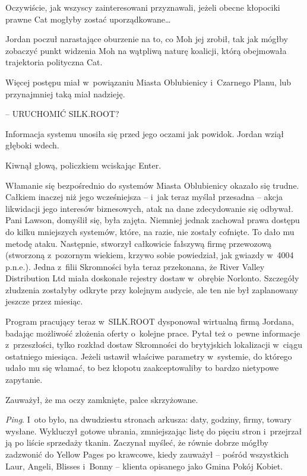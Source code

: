 \documentclass[oneside,polish,11pt,sfheadings]{mwbk}
\begin{document}
Oczywiście, jak wszyscy zainteresowani przyznawali, jeżeli obecne
kłopociki prawne Cat mogłyby zostać uporządkowane\ldots

Jordan poczuł narastające oburzenie na to, co Moh jej zrobił, tak jak
mógłby zobaczyć punkt widzenia Moh na wątpliwą naturę koalicji, którą
obejmowała trajektoria polityczna Cat.

Więcej postępu miał w~powiązaniu Miasta Oblubienicy i~Czarnego Planu,
lub przynajmniej taką miał nadzieję.

-- URUCHOMIĆ SILK.ROOT?

Informacja systemu unosiła się przed jego oczami jak powidok. Jordan
wziął głęboki wdech.

Kiwnął głową, policzkiem wciskając Enter.

Włamanie się bezpośrednio do systemów Miasta Oblubienicy okazało się
trudne. Całkiem inaczej niż jego wcześniejsza -- i~jak teraz myślał
przesadna -- akcja likwidacji jego interesów biznesowych, atak na dane
zdecydowanie się odbywał. Pani Lawson, domyślił się, była zajęta.
Niemniej jednak zachował prawa dostępu do kilku mniejszych systemów,
które, na razie, nie zostały cofnięte. To dało mu metodę ataku.
Następnie, stworzył całkowicie fałszywą firmę przewozową (stworzoną z~pozornym wiekiem, krzywo sobie powiedział, jak gwiazdy w~4004 p.n.e.).
Jedna z~filii Skromności była teraz przekonana, że River Valley
Distribution Ltd miała doskonałe rejestry dostaw w~obrębie Norlonto.
Szczegóły złudzenia zostałyby odkryte przy kolejnym audycie, ale ten nie
był zaplanowany jeszcze przez miesiąc.

Program pracujący teraz w~SILK.ROOT dysponował wirtualną firmą Jordana,
badając możliwość złożenia oferty o~kolejne prace. Pytał też o~pewne
informacje z~przeszłości, tylko rozkład dostaw Skromności do brytyjskich
lokalizacji w~ciągu ostatniego miesiąca. Jeżeli ustawił właściwe
parametry w~systemie, do którego udało mu się włamać, to bez kłopotu
zaakceptowaliby to bardzo nietypowe zapytanie.

Zauważył, że ma oczy zamknięte, palce skrzyżowane.

\emph{Ping}. I~oto było, na dwudziestu stronach arkusza: daty, godziny,
firmy, towary wysłane. Wykluczył gotowe ubrania, zmniejszając listę do
pięciu stron i~przejrzał ją po liście sprzedaży tkanin. Zaczynał myśleć,
że równie dobrze mógłby zadzwonić do Yellow Pages po krawcowe, kiedy
zauważył -- pośród wszystkich Laur, Angeli, Blisses i~Bonny -- klienta
opisanego jako Gmina Pokój Kobiet.
\end{document}
